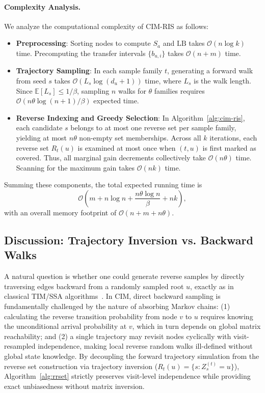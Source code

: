 \documentclass[sigconf]{acmart}
\newcommand{\CIMRIS}{\textsc{CIM-RIS}}
\begin{document}
\paragraph{Complexity Analysis.}
We analyze the computational complexity of \CIMRIS{} as follows:
\begin{itemize}
  \item \textbf{Preprocessing}: Sorting nodes to compute $S_a$ and $\mathrm{LB}$ takes $\mathcal{O}(n\log k)$ time.
  Precomputing the transfer intervals $\{b_{u,i}\}$ takes $\mathcal{O}(n+m)$ time.
  \item \textbf{Trajectory Sampling}: In each sample family $t$, generating a forward walk from seed $s$ takes $\mathcal{O}(L_s \log(d_u + 1))$ time, where $L_s$ is the walk length.
  Since $\mathbb{E}[L_s] \le 1/\beta$, sampling $n$ walks for $\theta$ families requires $\mathcal{O}(n\theta \log(n+1)/\beta)$ expected time.
  \item \textbf{Reverse Indexing and Greedy Selection}: In Algorithm~\ref{alg:cim-ris}, each candidate $s$ belongs to at most one reverse set per sample family, yielding at most $n\theta$ non-empty set memberships.
  Across all $k$ iterations, each reverse set $R_t(u)$ is examined at most once when $(t, u)$ is first marked as covered.
  Thus, all marginal gain decrements collectively take $\mathcal{O}(n\theta)$ time.
  Scanning for the maximum gain takes $\mathcal{O}(nk)$ time.
\end{itemize}
Summing these components, the total expected running time is
\begin{equation}
\label{eq:total-complexity}
  \mathcal{O}\!\left(m + n\log n + \frac{n\theta\log n}{\beta} + nk\right),
\end{equation}
with an overall memory footprint of $\mathcal{O}(n + m + n\theta)$.

\subsection{Discussion: Trajectory Inversion vs. Backward Walks}
\label{sec:discussion-sampling}

A natural question is whether one could generate reverse samples by directly
traversing edges backward from a randomly sampled root $u$, exactly as in
classical TIM/SSA algorithms~\cite{tang2015influence,chen2010scalable}.
In CIM, direct backward sampling is fundamentally challenged by the nature of
absorbing Markov chains:
(1) calculating the reverse transition probability from node $v$ to $u$ requires
knowing the unconditional arrival probability at $v$, which in turn depends on
global matrix reachability; and
(2) a single trajectory may revisit nodes cyclically with visit-resampled
independence, making local reverse random walks ill-defined without global state
knowledge.
By decoupling the forward trajectory simulation from the reverse set
construction via trajectory inversion ($R_t(u) = \{s: Z_s^{(t)}=u\}$),
Algorithm~\ref{alg:rrset} strictly preserves visit-level independence while
providing exact unbiasedness without matrix inversion.
\end{document}

